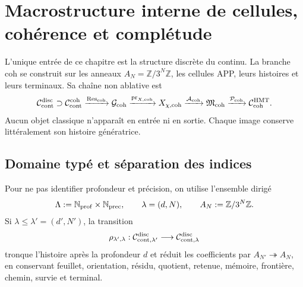 \iffalse

\chapter{Macrostructure interne de cellules, cohérence et complétude}
\label{chap:pdfv2-coh-interna}

\begin{statusbox}
L'unique entrée de ce chapitre est la structure discrète du continu. La
branche \(\mathrm{coh}\) se construit sur les anneaux
\(A_N=\mathbb Z/3^N\mathbb Z\), les cellules APP, leurs histoires et leurs
terminaux. Sa chaîne non ablative est
\[
 \mathcal C_{\rm cont}^{\rm disc}
 \supset\mathcal C_{\rm cont}^{\rm coh}
 \xrightarrow{\operatorname{Res}_{\rm coh}}
 \mathcal G_{\rm coh}
 \xrightarrow{\operatorname{pr}_{X,{\rm coh}}}
 X_{\chi,{\rm coh}}
 \xrightarrow{\mathcal A_{\rm coh}}
 \mathfrak M_{\rm coh}
 \xrightarrow{\mathcal P_{\rm coh}}
 \mathcal C_{\rm coh}^{\rm HMT}.
\]
Aucun objet classique n'apparaît en entrée ni en sortie. Chaque image
conserve littéralement son histoire génératrice.
\end{statusbox}

\section{Domaine typé et séparation des indices}
\label{sec:pdfv2-coh-domain}

Pour ne pas identifier profondeur et précision, on utilise l'ensemble dirigé
\begin{equation}\label{eq:pdfv2-coh-lambda}
 \Lambda:=\mathbb N_{\rm prof}\times\mathbb N_{\rm prec},
 \qquad
 \lambda=(d,N),
 \qquad
 A_N:=\mathbb Z/3^N\mathbb Z.
\end{equation}
Si \(\lambda\leq\lambda'=(d',N')\), la transition
\begin{equation}\label{eq:pdfv2-coh-rho-lambda}
 \rho_{\lambda',\lambda}:
 \mathcal C_{{\rm cont},\lambda'}^{\rm disc}
 \longrightarrow
 \mathcal C_{{\rm cont},\lambda}^{\rm disc}
\end{equation}
tronque l'histoire après la profondeur \(d\) et réduit les coefficients par
\(A_{N'}\twoheadrightarrow A_N\), en conservant feuillet, orientation, résidu,
quotient, retenue, mémoire, frontière, chemin, survie et terminal.

